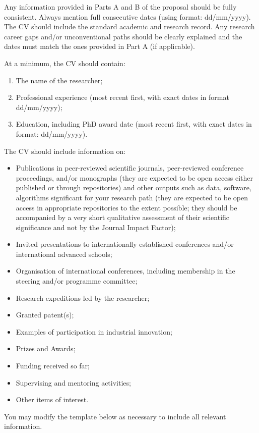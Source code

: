 \documentclass[12pt,draftproposal]{msca-pf}
\begin{document}
\begin{mscaexplanation}
Any information provided in Parts A and B of the proposal should be fully consistent.
Always mention full consecutive dates (using format: dd/mm/yyyy). The CV should
include the standard academic and research record. Any research career gaps
and/or unconventional paths should be clearly explained and the dates must match
the ones provided in Part A (if applicable).

At a minimum, the CV should contain:

\begin{enumerate}
    \renewcommand{\labelenumi}{\alph{enumi})}
    \item The name of the researcher;
    \item Professional experience (most recent first, with exact dates in format
    dd/mm/yyyy);
    \item Education, including PhD award date (most recent first, with exact
    dates in format: dd/mm/yyyy).
\end{enumerate}

The CV should include information on:

\begin{itemize}
    \item Publications in peer-reviewed scientific journals, peer-reviewed conference
    proceedings,  and/or monographs (they are expected to be open access either
    published or through repositories) and other outputs such as data, software,
    algorithms significant for your research path (they are expected to be open
    access in appropriate repositories to the extent possible; they should be
    accompanied by a very short qualitative assessment of their scientific
    significance and not by the Journal Impact Factor);

    \item Invited presentations to internationally established conferences and/or
    international advanced schools;

    \item Organisation of international conferences, including membership in
    the steering and/or programme committee;

    \item Research expeditions led by the researcher;

    \item Granted patent(s);

    \item Examples of participation in industrial innovation;

    \item Prizes and Awards;

    \item Funding received so far;

    \item Supervising and mentoring activities;

    \item Other items of interest.
\end{itemize}

You may modify the template below as necessary to include all relevant information.
\end{mscaexplanation}
\end{document}

